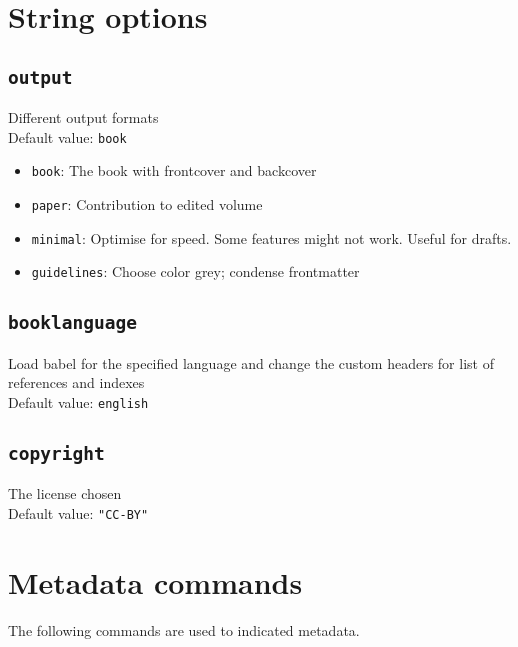\documentclass[%
output=guidelines,guidelines]{langscibook}
\newcommand{\option}[3]{\subsection{\texttt{#1}}{#2}\\Default value: {\texttt{#3}}}
\begin{document}
\section{String options}
\option{output}{Different output formats}{book}
\begin{itemize}
\item \texttt{book}: The book with frontcover and backcover
\item \texttt{paper}: Contribution to edited volume
\item \texttt{minimal}: Optimise for speed. Some features might not work. Useful for drafts.
\item \texttt{guidelines}: Choose color grey; condense frontmatter
\end{itemize}

\option{booklanguage}{Load babel for the specified language and change the custom headers for list of references and indexes}{english}
\option{copyright}{The license chosen}{"CC-BY"}



\section{Metadata commands}\label{sec:metadatacommands}
The following commands are used to indicated metadata.
\end{document}
